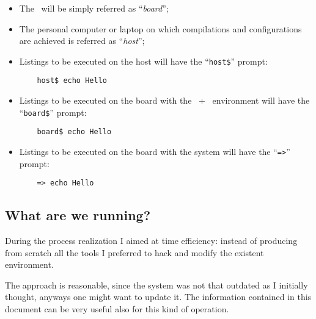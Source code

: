     \begin{itemize}

    \item   The \MyBoard\ will be simply referred as
            ``\emph{board}'';

    \item   The personal computer or laptop on which compilations and
            configurations are achieved is referred as ``\emph{host}'';

    \item   Listings to be executed on the host will have the
            ``\lstinline{host$}'' prompt:
\begin{lstlisting}
    host$ echo Hello
\end{lstlisting}

    \item   Listings to be executed on the board with the
            \BusyBox\ + \Linux\ environment will have the
            ``\lstinline{board$}'' prompt:
\begin{lstlisting}
    board$ echo Hello
\end{lstlisting}

    \item   Listings to be executed on the board with the \uBoot
            system will have the ``\lstinline{=>}'' prompt:
\begin{lstlisting}
    => echo Hello
\end{lstlisting}


    \end{itemize}

        \subsection{ What are we running? }

            During the process realization I aimed at time efficiency:
            instead of producing from scratch all the tools I preferred to
            hack and modify the existent environment.

            The approach is reasonable, since the system was not that
            outdated as I initially thought, anyways one might want to
            update it. The information contained in this document can be
            very useful also for this kind of operation.


